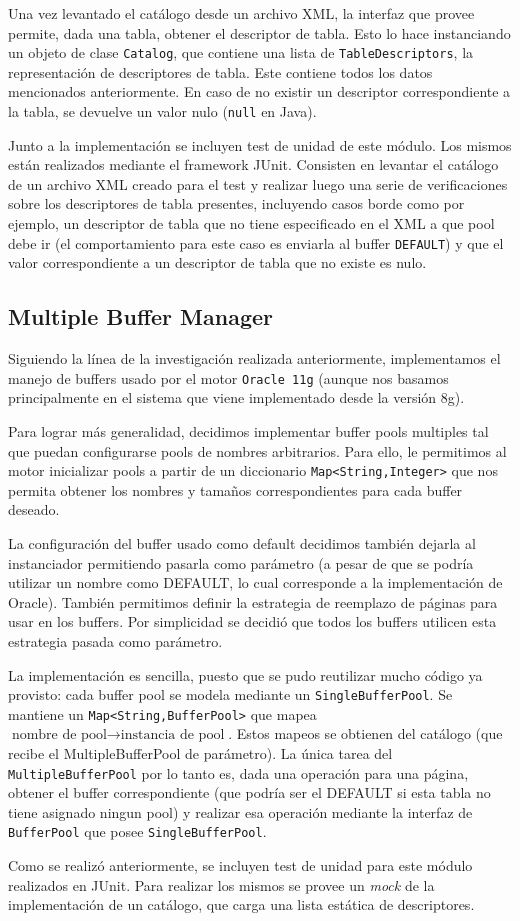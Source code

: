 Una vez levantado el cat\'alogo desde un archivo XML, la interfaz que provee permite, dada una tabla, obtener el descriptor de tabla. Esto lo hace instanciando un objeto de clase \texttt{Catalog}, que contiene una lista de \texttt{TableDescriptors}, la representaci\'on de descriptores de tabla. Este contiene todos los datos mencionados anteriormente. En caso de no existir un descriptor correspondiente a la tabla, se devuelve un valor nulo (\texttt{null} en Java).

Junto a la implementaci\'on se incluyen test de unidad de este m\'odulo. Los mismos est\'an realizados mediante el framework JUnit. Consisten en levantar el cat\'alogo de un archivo XML creado para el test y realizar luego una serie de verificaciones sobre los descriptores de tabla presentes, incluyendo casos borde como por ejemplo, un descriptor de tabla que no tiene especificado en el XML a que pool debe ir (el comportamiento para este caso es enviarla al buffer \texttt{DEFAULT}) y que el valor correspondiente a un descriptor de tabla que no existe es nulo.

\subsection{Multiple Buffer Manager}

Siguiendo la l\'inea de la investigaci\'on realizada anteriormente, implementamos el manejo de buffers usado por el motor \texttt{Oracle 11g} (aunque nos basamos principalmente en el sistema que viene implementado desde la versi\'on 8g).

Para lograr m\'as generalidad, decidimos implementar buffer pools multiples tal que puedan configurarse pools de nombres arbitrarios. Para ello, le permitimos al motor inicializar pools a partir de un diccionario \texttt{Map<String,Integer>} que nos permita obtener los nombres y tama\~nos correspondientes para cada buffer deseado.

La configuraci\'on del buffer usado como default decidimos tambi\'en dejarla al instanciador permitiendo pasarla como par\'ametro (a pesar de que se podr\'ia utilizar un nombre como DEFAULT, lo cual corresponde a la implementaci\'on de Oracle). Tambi\'en permitimos definir la estrategia de reemplazo de p\'aginas para usar en los buffers. Por simplicidad se decidi\'o que todos los buffers utilicen esta estrategia pasada como par\'ametro.

La implementaci\'on es sencilla, puesto que se pudo reutilizar mucho c\'odigo ya provisto: cada buffer pool se modela mediante un \texttt{SingleBufferPool}. Se mantiene un \texttt{Map<String,BufferPool>} que mapea $\text{nombre de pool} \rightarrow \text{instancia de pool}$. Estos mapeos se obtienen del cat\'alogo (que recibe el MultipleBufferPool de par\'ametro). La \'unica tarea del \texttt{MultipleBufferPool} por lo tanto es, dada una operaci\'on para una p\'agina, obtener el buffer correspondiente (que podría ser el DEFAULT si esta tabla no tiene asignado ningun pool) y realizar esa operaci\'on mediante la interfaz de \texttt{BufferPool} que posee \texttt{SingleBufferPool}.

Como se realizó anteriormente, se incluyen test de unidad para este m\'odulo realizados en JUnit. Para realizar los mismos se provee un \textit{mock} de la implementaci\'on de un cat\'alogo, que carga una lista est\'atica de descriptores.

